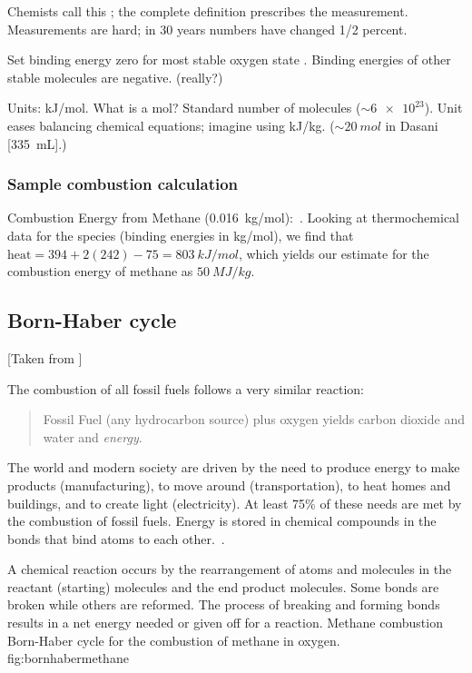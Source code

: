 Chemists call this ; the complete definition prescribes the measurement. Measurements are hard; in 30 years numbers have changed 1/2 percent.

Set binding energy zero for most stable oxygen state . Binding energies of other stable molecules are negative. (really?)

Units: \si{kJ/mol}. What is a mol? Standard number of molecules ($\sim\num{6e23}$). Unit eases balancing chemical equations; imagine using \si{kJ/kg}. ($\sim\SI{20}{mol}$ in Dasani [\SI{335}{mL}].)


\subsubsection*{Sample combustion calculation}
%
Combustion Energy from Methane (\SI{0.016}{kg/mol}):
%
\beq
    \,.
\eeq
%
Looking at thermochemical data for the species (binding energies in \si{kg/mol}), we find that $\text{heat} = 394 + 2(242) - 75 = \SI{803}{kJ/mol}$, which yields our estimate for the combustion energy of methane as $\SI{50}{MJ/kg}$.


\subsection*{Born-Haber cycle}
%
[Taken from \citep{ophardt:bornhaner}]

The combustion of all fossil fuels follows a very similar reaction:
%
\begin{quote}
Fossil Fuel (any hydrocarbon source) plus oxygen yields carbon dioxide and water and \emph{energy}.
\end{quote}

The world and modern society are driven by the need to produce energy to make products (manufacturing), to move around (transportation), to heat homes and buildings, and to create light (electricity). At least 75\% of these needs are met by the combustion of fossil fuels. Energy is stored in chemical compounds in the bonds that bind atoms to each other.
%
\beq
    \,.
\eeq
 
A chemical reaction occurs by the rearrangement of atoms and molecules in the reactant (starting) molecules and the end product molecules. Some bonds are broken while others are reformed. The process of breaking and forming bonds results in a net energy needed or given off for a reaction.
%
%
%
  {Methane combustion}%
  {Born-Haber cycle for the combustion of methane in oxygen. \citep{ophardt:bornhaner}}%
  {fig:bornhabermethane}%
%
%

